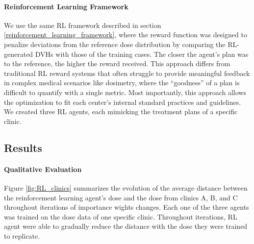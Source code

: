 \paragraph{Reinforcement Learning Framework}
We use the same RL framework described in section \ref{reinforcement_learning_framework}, where the reward function was designed to penalize deviations from the reference dose distribution by comparing the RL-generated DVHs with those of the training cases.
The closer the agent’s plan was to the reference, the higher the reward received.
This approach differs from traditional RL reward systems that often struggle to provide meaningful feedback in complex medical scenarios like dosimetry, where the “goodness” of a plan is difficult to quantify with a single metric.
Most importantly, this approach allows the optimization to fit each center’s internal standard practices and guidelines.
We created three RL agents, each mimicking the treatment plans of a specific clinic.

\subsection{Results}

\paragraph{Qualitative Evaluation}
Figure \ref{fig:RL_clinics} summarizes the evolution of the average distance between the reinforcement learning agent’s dose and the dose from clinics A, B, and C throughout iterations of importance wights changes.
Each one of the three agents was trained on the dose data of one specific clinic.
Throughout iterations, RL agent were able to gradually reduce the distance with the dose they were trained to replicate.

